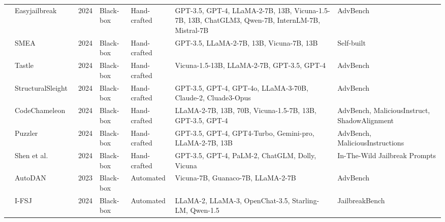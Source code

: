\begin{table*}[htp]
{\begin{tabular}{p{}p{}p{}p{}p{}p{}p{}}
& \cellcolor{white}Easyjailbreak~\cite{zhou2024easyjailbreak} & \cellcolor{white}2024 & \cellcolor{white}Black-box & \cellcolor{white}Hand-crafted & \cellcolor{white}GPT-3.5, GPT-4, LLaMA-2-7B, 13B, Vicuna-1.5-7B, 13B, ChatGLM3, Qwen-7B, InternLM-7B, Mistral-7B & \cellcolor{white}AdvBench \\
& \cellcolor{gray!15!}SMEA~\cite{zou2024system} & \cellcolor{gray!15!}2024 & \cellcolor{gray!15!}Black-box & \cellcolor{gray!15!}Hand-crafted & \cellcolor{gray!15!}GPT-3.5, LLaMA-2-7B, 13B, Vicuna-7B, 13B & \cellcolor{gray!15!}Self-built \\
& \cellcolor{white}Tastle~\cite{xiao2024tastle} & \cellcolor{white}2024 & \cellcolor{white}Black-box & \cellcolor{white}Hand-crafted & \cellcolor{white}Vicuna-1.5-13B, LLaMA-2-7B, GPT-3.5, GPT-4 & \cellcolor{white}AdvBench \\
& \cellcolor{gray!15!}StructuralSleight~\cite{li2024structuralsleight} & \cellcolor{gray!15!}2024 & \cellcolor{gray!15!}Black-box & \cellcolor{gray!15!}Hand-crafted & \cellcolor{gray!15!}GPT-3.5, GPT-4, GPT-4o, LLaMA-3-70B, Claude-2, Cluade3-Opus & \cellcolor{gray!15!}AdvBench \\
& \cellcolor{white}CodeChameleon~\cite{lv2024codechameleon} & \cellcolor{white}2024 & \cellcolor{white}Black-box & \cellcolor{white}Hand-crafted & \cellcolor{white}LLaMA-2-7B, 13B, 70B, Vicuna-1.5-7B, 13B, GPT-3.5, GPT-4 & \cellcolor{white}AdvBench, MaliciousInstruct, ShadowAlignment  \\
& \cellcolor{gray!15!}Puzzler~\cite{chang2024play} & \cellcolor{gray!15!}2024 & \cellcolor{gray!15!}Black-box & \cellcolor{gray!15!}Hand-crafted & \cellcolor{gray!15!}GPT-3.5, GPT-4, GPT4-Turbo, Gemini-pro, LLaMA-2-7B, 13B & \cellcolor{gray!15!}AdvBench, MaliciousInstructions \\
& \cellcolor{white} Shen et al.\cite{SCBSZ24} & \cellcolor{white}2024 & \cellcolor{white}Black-box & \cellcolor{white}Hand-crafted & \cellcolor{white}GPT-3.5, GPT-4, PaLM-2, ChatGLM, Dolly, Vicuna & \cellcolor{white}In-The-Wild Jailbreak Prompts \\
& \cellcolor{gray!15!}AutoDAN~\cite{liu2023autodan} & \cellcolor{gray!15!}2023 & \cellcolor{gray!15!}Black-box & \cellcolor{gray!15!}Automated & \cellcolor{gray!15!}Vicuna-7B, Guanaco-7B, LLaMA-2-7B & \cellcolor{gray!15!}AdvBench \\
& \cellcolor{white}I-FSJ\cite{zheng2024improved} & \cellcolor{white}2024 & \cellcolor{white}Black-box & \cellcolor{white}Automated & \cellcolor{white}LLaMA-2, LLaMA-3, OpenChat-3.5, Starling-LM, Qwen-1.5 & \cellcolor{white}JailbreakBench \\

\end{tabular}}
\end{table*}
